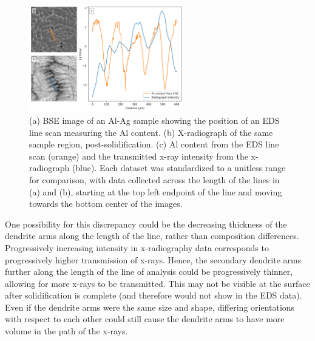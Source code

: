 \begin{figure}[ht]
    \centering
    \includegraphics[width=0.6\textwidth]{figures/03/06-eds-vs-rad-05-17-1.png}
    \caption{
        \small{}
        (a) BSE image of an Al-Ag sample showing the position of an EDS
        line scan measuring the Al content.
        (b) X-radiograph of the same sample region, post-solidification.
        (c) Al content from the EDS line scan (orange) and the transmitted
        x-ray intensity from the x-radiograph (blue). Each dataset was
        standardized to a unitless range for comparison, with data collected
        across the length of the lines in (a) and (b), starting at the top
        left endpoint of the line and moving towards the bottom center of
        the images.
    }
    \label{fig/03/eds-vs-rad-2}
\end{figure}

One possibility for this discrepancy could be the decreasing thickness of
the dendrite arms along the length of the line, rather than composition
differences. Progressively increasing intensity in x-radiography data
corresponds to progressively higher transmission of x-rays. Hence, the
secondary dendrite arms further along the length of the line of analysis
could be progressively thinner, allowing for more x-rays to be
transmitted. This may not be visible at the surface after solidification
is complete (and therefore would not show in the EDS data). Even if the
dendrite arms were the same size and shape, differing orientations with
respect to each other could still cause the dendrite arms to have more
volume in the path of the x-rays.


